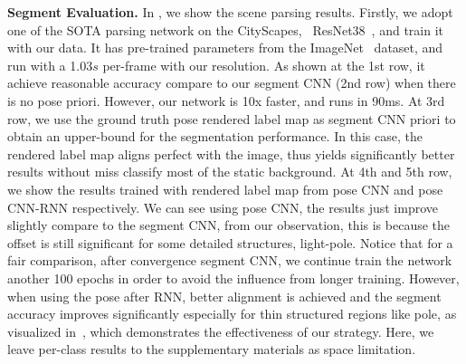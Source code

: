 \textbf{Segment Evaluation.}
In , we show the scene parsing results. 
Firstly, we adopt one of the SOTA parsing network on the CityScapes, \ie~ResNet38~\cite{WuSH16e}, and train it with our data. It has pre-trained parameters from the ImageNet~\cite{deng2009imagenet} dataset, and run with a 1.03$s$ per-frame with our resolution. As shown at the 1st row, it achieve reasonable accuracy compare to our segment CNN (2nd row) when there is no pose priori. However, our network is 10x faster, and runs in 90ms. 
At 3rd row, we use the ground truth pose rendered label map as segment CNN priori to obtain an upper-bound for the segmentation performance. 
In this case, the rendered label map aligns perfect with the image, thus yields significantly better results without miss classify most of the static background.
At 4th and 5th row, we show the results trained with rendered label map from pose CNN and pose CNN-RNN respectively. We can see using pose CNN, the results just improve slightly compare to the segment CNN, from our observation, this is because the offset is still significant for some detailed structures, \eg light-pole.
Notice that for a fair comparison, after convergence segment CNN, we continue train the network another 100 epochs in order to avoid the influence from longer training.
However, when using the pose after RNN, better alignment is achieved and the segment accuracy improves significantly especially for thin structured regions like pole, as visualized in~, which demonstrates the effectiveness of our strategy. 
Here, we leave per-class results to the supplementary materials as space limitation.

